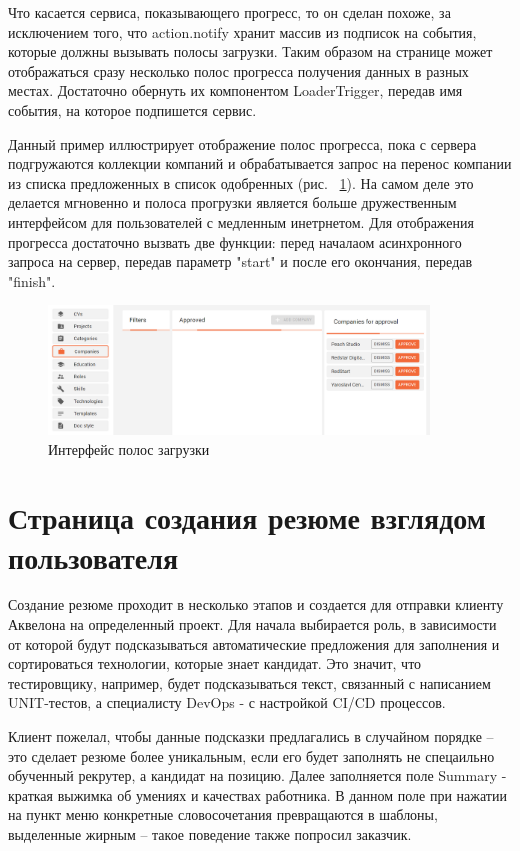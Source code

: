 \documentclass[a4paper,12pt]{diplom}
\begin{document}
Что касается сервиса, показывающего прогресс, то он сделан похоже, за исключением того, что action.notify хранит массив
из подписок на события, которые должны вызывать полосы загрузки. Таким образом на странице может отображаться сразу несколько полос прогресса получения данных в разных местах. Достаточно обернуть их 
компонентом LoaderTrigger, передав имя события, на которое подпишется сервис. 

Данный пример иллюстрирует отображение полос прогресса, пока с сервера подгружаются коллекции компаний и обрабатывается запрос на перенос компании из списка предложенных в список одобренных (рис. ~\ref{6}).
На самом деле это делается мгновенно и полоса прогрузки является больше дружественным интерфейсом для пользователей с медленным инетрнетом. Для отображения прогресса достаточно вызвать две функции: перед началаом асинхронного запроса на сервер, передав параметр "start" и после его окончания, передав "finish".

\begin{figure}[!ht]
	\centering
	\includegraphics[width=0.9\textwidth]{resources/progress.png}
	\caption{Интерфейс полос загрузки}
	\label{6}
\end{figure}

\section{Страница создания резюме взглядом пользователя}
Создание резюме проходит в несколько этапов и создается для отправки клиенту Аквелона на определенный проект.
Для начала выбирается роль, в зависимости от которой будут подсказываться автоматические предложения для заполнения и сортироваться технологии, которые знает кандидат. Это значит, что тестировщику, например, будет подсказываться текст, 
связанный с написанием UNIT-тестов, а специалисту DevOps - с настройкой CI/CD процессов.

Клиент пожелал, чтобы данные подсказки предлагались в случайном порядке -- это сделает резюме более уникальным, если его будет заполнять не спецаильно обученный рекрутер, а кандидат на позицию.
Далее заполняется поле Summary - краткая выжимка об умениях и качествах работника. В данном поле при нажатии на пункт меню конкретные словосочетания превращаются в шаблоны, выделенные жирным -- такое поведение также попросил заказчик.
\end{document}
